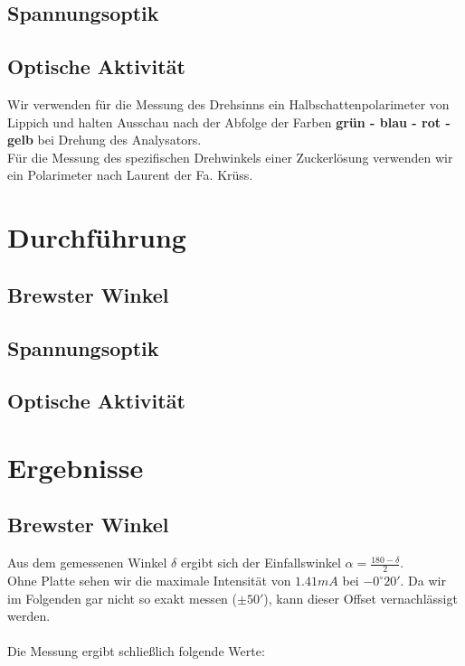 \documentclass[twoside]{article}
\begin{document}
\subsection{Spannungsoptik}

\subsection{Optische Aktivität}
Wir verwenden für die Messung des Drehsinns ein Halbschattenpolarimeter von Lippich und halten Ausschau nach der Abfolge der Farben \textbf{grün - blau - rot - gelb} bei Drehung des Analysators.\\
Für die Messung des spezifischen Drehwinkels einer Zuckerlösung verwenden wir ein Polarimeter nach Laurent der Fa. Krüss.
\section{Durchführung}
\subsection{Brewster Winkel}
\subsection{Spannungsoptik}
\subsection{Optische Aktivität}

\section{Ergebnisse}
\subsection{Brewster Winkel}
Aus dem gemessenen Winkel $\delta$ ergibt sich der Einfallswinkel $\alpha=\frac{180-\delta}{2}$.\\
Ohne Platte sehen wir die maximale Intensität von $1.41 \si{mA}$ bei $-0^\circ20'$. Da wir im Folgenden gar nicht so exakt messen ($\pm 50'$), kann dieser Offset vernachlässigt werden.\\
\\
Die Messung ergibt schließlich folgende Werte:
\end{document}
